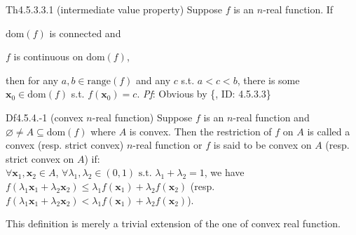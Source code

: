 \documentclass{article}
\begin{document}
\begin{Th}{Th4.5.3.3.1 (intermediate value property)}
    Suppose $f$ is an $n$-real function. If
    \begin{compactenum}
        \item $\text{dom}(f)$ is connected and
        \item $f$ is continuous on $\text{dom}(f)$,
    \end{compactenum}
    then for any $a, b\in\text{range}(f)$ and any $c$ s.t. $a<c<b$, there is some $\pmb{x}_0\in\text{dom}(f)$ s.t. $f(\pmb{x}_0) = c$.
    \tcblower
    \textit{Pf}: Obvious by \{, ID: 4.5.3.3\}
\end{Th}

\begin{Df}{Df4.5.4.-1 (convex $n$-real function)}
    Suppose $f$ is an $n$-real function and $\varnothing\neq A\subseteq\text{dom}(f)$ where $A$ is convex. Then the restriction of $f$ on $A$ is called a convex (resp. strict convex) $n$-real function or $f$ is said to be convex on $A$ (resp. strict convex on $A$) if: \\
    $\forall \pmb{x}_1, \pmb{x}_2\in A$, $\forall \lambda_1, \lambda_2\in (0,1) \text{ s.t. } \lambda_1+\lambda_2=1$, we have $f(\lambda_1 \pmb{x}_1 + \lambda_2 \pmb{x}_2) \leq \lambda_1 f(\pmb{x}_1) + \lambda_2 f(\pmb{x}_2)$ (resp. $f(\lambda_1 \pmb{x}_1 + \lambda_2 \pmb{x}_2) < \lambda_1 f(\pmb{x}_1) + \lambda_2 f(\pmb{x}_2)$).
\end{Df}

\begin{Rmk}{}
    This definition is merely a trivial extension of the one of convex real function.
\end{Rmk}
\end{document}
